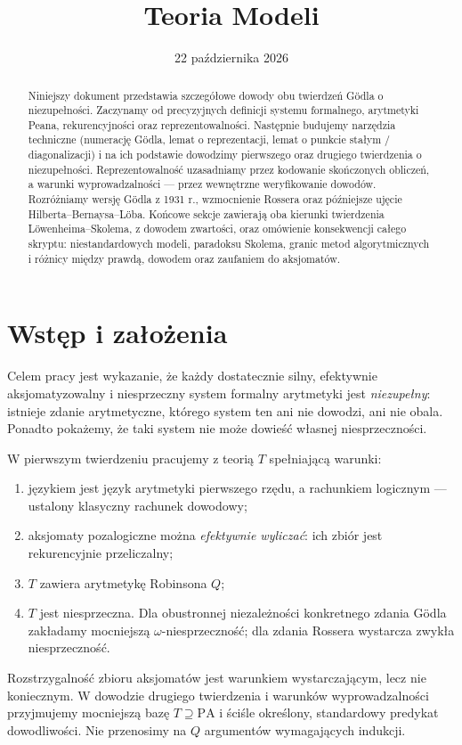 \documentclass[11pt,a4paper]{article}
\title{Teoria Modeli}
\author{}
\date{22 października 2026}
\numberwithin{equation}{section}
\theoremstyle{plain}
\theoremstyle{definition}
\theoremstyle{remark}
\begin{document}
\maketitle
\begin{abstract}
Niniejszy dokument przedstawia szczegółowe dowody obu twierdzeń Gödla o niezupełności.
Zaczynamy od precyzyjnych definicji systemu formalnego, arytmetyki Peana, rekurencyjności
oraz reprezentowalności. Następnie budujemy narzędzia techniczne (numerację Gödla,
lemat o reprezentacji, lemat o punkcie stałym / diagonalizacji) i na ich podstawie dowodzimy
pierwszego oraz drugiego twierdzenia o niezupełności. Reprezentowalność uzasadniamy
przez kodowanie skończonych obliczeń, a warunki wyprowadzalności --- przez wewnętrzne
weryfikowanie dowodów. Rozróżniamy wersję Gödla z 1931 r., wzmocnienie Rossera oraz
późniejsze ujęcie Hilberta--Bernaysa--Löba. Końcowe sekcje zawierają oba kierunki
twierdzenia Löwenheima--Skolema, z dowodem zwartości, oraz omówienie konsekwencji
całego skryptu: niestandardowych modeli, paradoksu Skolema, granic metod algorytmicznych
i różnicy między prawdą, dowodem oraz zaufaniem do aksjomatów.
\end{abstract}
\tableofcontents
\clearpage

\section{Wstęp i założenia}\label{sec:wstep}
Celem pracy jest wykazanie, że każdy dostatecznie silny, efektywnie aksjomatyzowalny i niesprzeczny system formalny arytmetyki jest \emph{niezupełny}: istnieje zdanie arytmetyczne, którego system ten ani nie dowodzi, ani nie obala. Ponadto pokażemy, że taki system nie może dowieść własnej niesprzeczności.

W pierwszym twierdzeniu pracujemy z teorią $T$ spełniającą warunki:
\begin{enumerate}[label=(\roman*)]
\item językiem jest język arytmetyki pierwszego rzędu, a rachunkiem logicznym --- ustalony klasyczny rachunek dowodowy;
\item aksjomaty pozalogiczne można \emph{efektywnie wyliczać}: ich zbiór jest rekurencyjnie przeliczalny;
\item $T$ zawiera arytmetykę Robinsona $Q$;
\item $T$ jest niesprzeczna. Dla obustronnej niezależności konkretnego zdania Gödla zakładamy mocniejszą $\omega$-niesprzeczność; dla zdania Rossera wystarcza zwykła niesprzeczność.
\end{enumerate}
Rozstrzygalność zbioru aksjomatów jest warunkiem wystarczającym, lecz nie koniecznym. W dowodzie drugiego twierdzenia i warunków wyprowadzalności przyjmujemy mocniejszą bazę $T\supseteq\mathrm{PA}$ i ściśle określony, standardowy predykat dowodliwości. Nie przenosimy na $Q$ argumentów wymagających indukcji.
\end{document}
